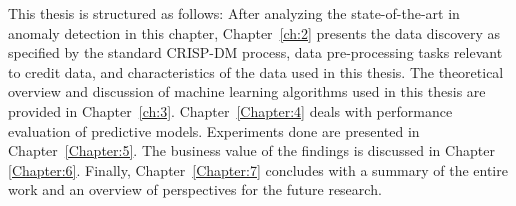 This thesis is structured as follows: After analyzing the state-of-the-art in anomaly detection in this chapter, Chapter~\ref{ch:2} presents the data discovery as specified by the standard CRISP-DM process, data pre-processing tasks relevant to credit data, and characteristics of the data used in this thesis. The theoretical overview and discussion of machine learning algorithms used in this thesis are provided in Chapter~\ref{ch:3}. Chapter~\ref{Chapter:4} deals with performance evaluation of predictive models. Experiments done are presented in Chapter~\ref{Chapter:5}. The business value of the findings is discussed in Chapter \ref{Chapter:6}. Finally, Chapter~\ref{Chapter:7} concludes with a summary of the entire work and an overview of perspectives for the future research. 
